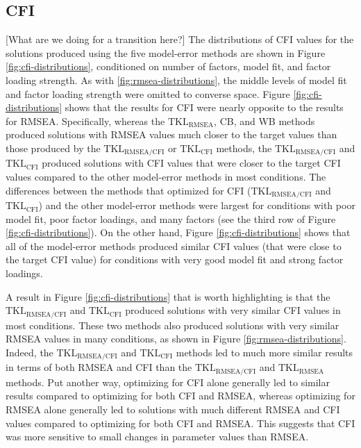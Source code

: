 \documentclass[11pt]{umnthesis}
\begin{document}
\hypertarget{cfi}{%
\subsection{CFI}\label{cfi}}

{[}What are we doing for a transition here?{]} The distributions of CFI values for the solutions produced using the five model-error methods are shown in Figure \ref{fig:cfi-distributions}, conditioned on number of factors, model fit, and factor loading strength. As with \ref{fig:rmsea-distributions}, the middle levels of model fit and factor loading strength were omitted to converse space. Figure \ref{fig:cfi-distributions} shows that the results for CFI were nearly opposite to the results for RMSEA. Specifically, whereas the \(\textrm{TKL}_{\textrm{RMSEA}}\), CB, and WB methods produced solutions with RMSEA values much closer to the target values than those produced by the \(\textrm{TKL}_{\textrm{RMSEA/CFI}}\) or \(\textrm{TKL}_{\textrm{CFI}}\) methods, the \(\textrm{TKL}_{\textrm{RMSEA/CFI}}\) and \(\textrm{TKL}_{\textrm{CFI}}\) produced solutions with CFI values that were closer to the target CFI values compared to the other model-error methods in most conditions. The differences between the methods that optimized for CFI (\(\textrm{TKL}_{\textrm{RMSEA/CFI}}\) and \(\textrm{TKL}_{\textrm{CFI}}\)) and the other model-error methods were largest for conditions with poor model fit, poor factor loadings, and many factors (see the third row of Figure \ref{fig:cfi-distributions}). On the other hand, Figure \ref{fig:cfi-distributions} shows that all of the model-error methods produced similar CFI values (that were close to the target CFI value) for conditions with very good model fit and strong factor loadings.

A result in Figure \ref{fig:cfi-distributions} that is worth highlighting is that the \(\textrm{TKL}_{\textrm{RMSEA/CFI}}\) and \(\textrm{TKL}_{\textrm{CFI}}\) produced solutions with very similar CFI values in most conditions. These two methods also produced solutions with very similar RMSEA values in many conditions, as shown in Figure \ref{fig:rmsea-distributions}. Indeed, the \(\textrm{TKL}_{\textrm{RMSEA/CFI}}\) and \(\textrm{TKL}_{\textrm{CFI}}\) methods led to much more similar results in terms of both RMSEA and CFI than the \(\textrm{TKL}_{\textrm{RMSEA/CFI}}\) and \(\textrm{TKL}_{\textrm{RMSEA}}\) methods. Put another way, optimizing for CFI alone generally led to similar results compared to optimizing for both CFI and RMSEA, whereas optimizing for RMSEA alone generally led to solutions with much different RMSEA and CFI values compared to optimizing for both CFI and RMSEA. This suggests that CFI was more sensitive to small changes in parameter values than RMSEA.
\end{document}
